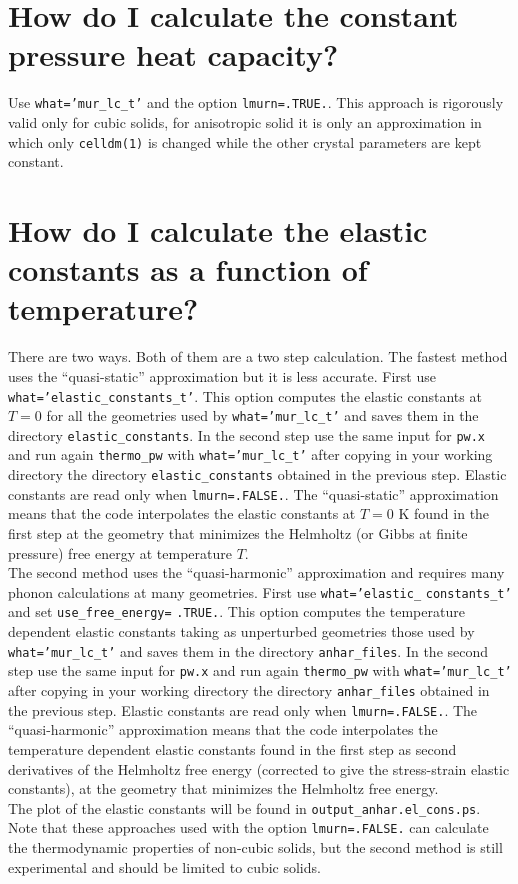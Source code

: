 \documentclass[12pt,a4paper]{article}
\begin{document}
\newpage
\section{\color{coral}How do I calculate the constant pressure heat capacity?}
Use \texttt{what='mur\_lc\_t'} and the option \texttt{lmurn=.TRUE.}.
This approach is rigorously valid only for cubic solids, for anisotropic
solid it is only an approximation in which only \texttt{celldm(1)} is
changed while the other crystal parameters are kept constant.

\newpage
\section{\color{coral}How do I calculate the elastic constants 
as a function of temperature?}
There are two ways. Both of them are a two step calculation. 
The fastest method uses the ``quasi-static'' approximation but it
is less accurate.
First use 
\texttt{what='elastic\_constants\_t'}. This option computes the elastic
constants at $T=0$ for all the geometries used by 
\texttt{what='mur\_lc\_t'} and
saves them in the directory \texttt{elastic\_constants}.  
In the second step use the same input for \texttt{pw.x} and run again 
\texttt{thermo\_pw} with \texttt{what='mur\_lc\_t'} after copying in your
working directory the directory \texttt{elastic\_constants} obtained 
in the previous step. Elastic constants are read only when
\texttt{lmurn=.FALSE.}.
The ``quasi-static'' approximation means that the code interpolates
the elastic constants at $T=0$ K found in the first step at the geometry that
minimizes the Helmholtz (or Gibbs at finite pressure) free energy at
temperature $T$. \\
The second method uses the ``quasi-harmonic'' approximation and
requires many phonon calculations at many geometries.
First use \texttt{what='elastic\_} \texttt{constants\_t'} and set
\texttt{use\_free\_energy=} \texttt{.TRUE.}. This option computes the 
temperature dependent elastic constants taking as unperturbed geometries 
those used by \texttt{what='mur\_lc\_t'} and saves them in the directory 
\texttt{anhar\_files}.  
In the second step use the same input for \texttt{pw.x} and run again 
\texttt{thermo\_pw} with \texttt{what='mur\_lc\_t'} after copying in your
working directory the directory \texttt{anhar\_files} obtained 
in the previous step. Elastic constants are read only when
\texttt{lmurn=.FALSE.}. 
The ``quasi-harmonic'' approximation means that the code interpolates
the temperature dependent elastic constants found in the first step as
second derivatives of the Helmholtz free energy (corrected to give the
stress-strain elastic constants), at the geometry that
minimizes the Helmholtz free energy. \\
The plot of the elastic constants will be found in 
\texttt{output\_anhar.el\_cons.ps}.
Note that these approaches used with the option \texttt{lmurn=.FALSE.} can
calculate the thermodynamic properties of non-cubic solids, but the
second method is still experimental and should be limited to cubic solids.
\end{document}
